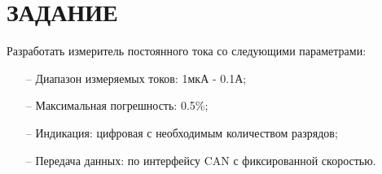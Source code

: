 \begin{sloppypar} %
\newpage %
\section*{ЗАДАНИЕ} %

Разработать измеритель постоянного тока со следующими параметрами:
\begin{itemize}
	\item[--]Диапазон измеряемых токов: 1мкА - 0.1А;
	\item[--]Максимальная погрешность: 0.5\%;
	\item[--]Индикация: цифровая с необходимым количеством разрядов;
	\item[--]Передача данных: по интерфейсу CAN с фиксированной скоростью.
\end{itemize}
\end{sloppypar}